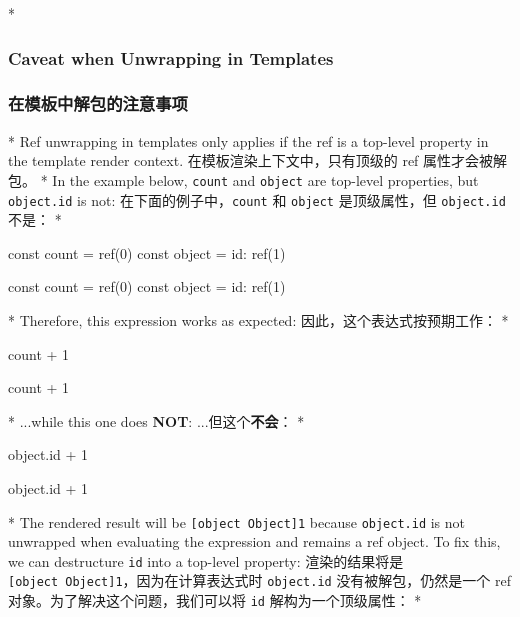 \begin{paracol}{2}
\switchcolumn[0]*%
\subsubsection{Caveat when Unwrapping in Templates}
\switchcolumn
\subsubsection{在模板中解包的注意事项}
\switchcolumn[0]*%
Ref unwrapping in templates only applies if the ref is a top-level
property in the template render context.
\switchcolumn
在模板渲染上下文中，只有顶级的 ref 属性才会被解包。
\switchcolumn[0]*%
In the example below, \texttt{count} and \texttt{object} are top-level
properties, but \texttt{object.id} is not:
\switchcolumn
在下面的例子中，\texttt{count} 和 \texttt{object} 是顶级属性，但
\texttt{object.id} 不是：
\switchcolumn[0]*%
\begin{codeJs}
const count = ref(0)
const object = { id: ref(1) }
\end{codeJs}
\switchcolumn
\begin{codeJs}
const count = ref(0)
const object = { id: ref(1) }
\end{codeJs}
\switchcolumn[0]*%
Therefore, this expression works as expected:
\switchcolumn
因此，这个表达式按预期工作：
\switchcolumn[0]*%
\begin{codeHtml}
{{ count + 1 }}
\end{codeHtml}
\switchcolumn
\begin{codeHtml}
{{ count + 1 }}
\end{codeHtml}
\switchcolumn[0]*%
...while this one does \textbf{NOT}:
\switchcolumn
...但这个\textbf{不会}：
\switchcolumn[0]*%
\begin{codeHtml}
{{ object.id + 1 }}
\end{codeHtml}
\switchcolumn
\begin{codeHtml}
{{ object.id + 1 }}
\end{codeHtml}
\switchcolumn[0]*%
The rendered result will be \texttt{{[}object\ Object{]}1} because
\texttt{object.id} is not unwrapped when evaluating the expression and
remains a ref object. To fix this, we can destructure \texttt{id} into a
top-level property:
\switchcolumn
渲染的结果将是 \texttt{{[}object\ Object{]}1}，因为在计算表达式时
\texttt{object.id} 没有被解包，仍然是一个 ref
对象。为了解决这个问题，我们可以将 \texttt{id} 解构为一个顶级属性：
\switchcolumn[0]*%

\end{paracol}
